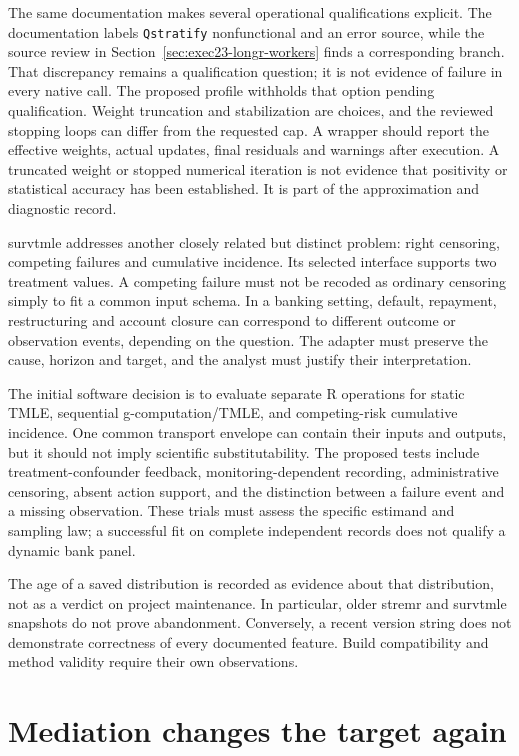 The same documentation makes several operational qualifications explicit.
The documentation labels \texttt{Qstratify} nonfunctional and an error source,
while the source review in Section~\ref{sec:exec23-longr-workers} finds a
corresponding branch. That discrepancy remains a qualification question;
it is not evidence of failure in every native call. The proposed profile
withholds that option pending qualification. Weight truncation and stabilization
are choices, and the reviewed stopping loops can differ from the requested
cap. A wrapper should report the effective weights, actual updates, final
residuals and warnings after execution. A truncated weight or stopped numerical
iteration is not evidence that positivity or statistical accuracy has been
established. It is part of the approximation and diagnostic record.

survtmle addresses another closely related but distinct problem: right
censoring, competing failures and cumulative incidence. Its selected interface
supports two treatment values. A competing failure must not be recoded as
ordinary censoring simply to fit a common input schema. In a banking setting,
default, repayment, restructuring and account closure can correspond to
different outcome or observation events, depending on the question. The
adapter must preserve the cause, horizon and target, and the analyst must
justify their interpretation. \citep{v12_sw_survtmle}

The initial software decision is to evaluate separate R operations for static
TMLE, sequential g-computation/TMLE, and competing-risk cumulative incidence.
One common transport envelope can contain their inputs and outputs, but it
should not imply scientific substitutability. The proposed tests include
treatment-confounder feedback, monitoring-dependent recording, administrative
censoring, absent action support, and the distinction between a failure event
and a missing observation. These trials must assess the specific estimand and
sampling law; a successful fit on complete independent records does not
qualify a dynamic bank panel.

The age of a saved distribution is recorded as evidence about that distribution,
not as a verdict on project maintenance. In particular, older stremr and
survtmle snapshots do not prove abandonment. Conversely, a recent version
string does not demonstrate correctness of every documented feature. Build
compatibility and method validity require their own observations.

\section{Mediation changes the target again}


